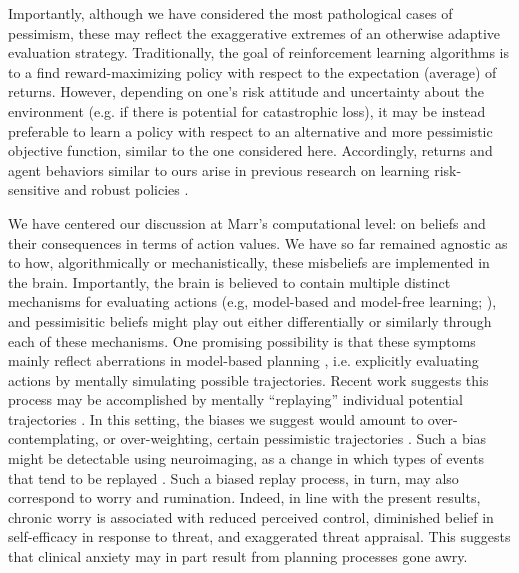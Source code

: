 \documentclass[11pt]{article} %
\begin{document}
Importantly, although we have considered the most pathological cases of pessimism, these may reflect the exaggerative extremes of an otherwise adaptive evaluation strategy. Traditionally, the goal of reinforcement learning algorithms is to a find reward-maximizing policy with respect to the expectation (average) of returns. However, depending on one's risk attitude and uncertainty about the environment (e.g. if there is potential for catastrophic loss), it may be instead preferable to learn a policy with respect to an alternative and more pessimistic objective function, similar to the one considered here. Accordingly, returns and agent behaviors similar to ours arise in previous research on learning risk-sensitive and robust policies \cite{morimura2012, chow2015, bellemare2017}. 

We have centered our discussion at Marr's \cite{marr1982} computational level: on beliefs and their consequences in terms of action values. We have so far remained agnostic as to how, algorithmically or mechanistically, these misbeliefs are implemented in the brain. Importantly, the brain is believed to contain multiple distinct mechanisms for evaluating actions (e.g, model-based and model-free learning; \cite{daw2005, huys2015}), and pessimisitic beliefs might play out either differentially or similarly through each of these mechanisms. One promising possibility is that these symptoms mainly reflect aberrations in model-based planning \cite{huys2015}, i.e. explicitly evaluating actions by mentally simulating possible trajectories. Recent work suggests this process may be accomplished by mentally ``replaying'' individual potential trajectories \cite{momennejad_offline_2018,mattar2018}. In this setting, the biases we suggest would amount to over-contemplating, or over-weighting, certain pessimistic trajectories \cite{hunter2019}. Such a bias might be detectable using neuroimaging, as a change in which types of events that tend to be replayed \cite{momennejad_offline_2018, ambrose2016}. Such a biased replay process, in turn, may also correspond to worry and rumination. Indeed, in line with the present results, chronic worry is associated with reduced perceived control, diminished belief in self-efficacy in response to threat, and exaggerated threat appraisal\cite{Berenbaum2010}. This suggests that clinical anxiety may in part result from planning processes gone awry. 
\end{document}
